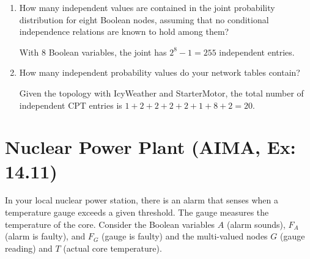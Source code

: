 \documentclass[11pt, a4paper]{article}
\begin{document}
\begin{enumerate}
    \item How many independent values are contained in the joint probability distribution for eight Boolean nodes, assuming that no conditional independence relations are known to hold among them?

    \begin{solution}
        With 8 Boolean variables, the joint has $2^8 - 1 = 255$ independent entries.
    \end{solution}

    \item How many independent probability values do your network tables contain?

    \begin{solution}
        Given the topology with IcyWeather and StarterMotor, the total number of independent CPT entries is $1 + 2 + 2 + 2 + 2 + 1 + 8 + 2 = 20$.
    \end{solution}
\end{enumerate}

\newpage

\section{Nuclear Power Plant (AIMA, Ex: 14.11)}

In your local nuclear power station, there is an alarm that senses when a temperature gauge exceeds a given threshold. The gauge measures the temperature of the core. Consider the Boolean variables $A$ (alarm sounds), $F_A$ (alarm is faulty), and $F_G$ (gauge is faulty) and the multi-valued nodes $G$ (gauge reading) and $T$ (actual core temperature).
\end{document}
